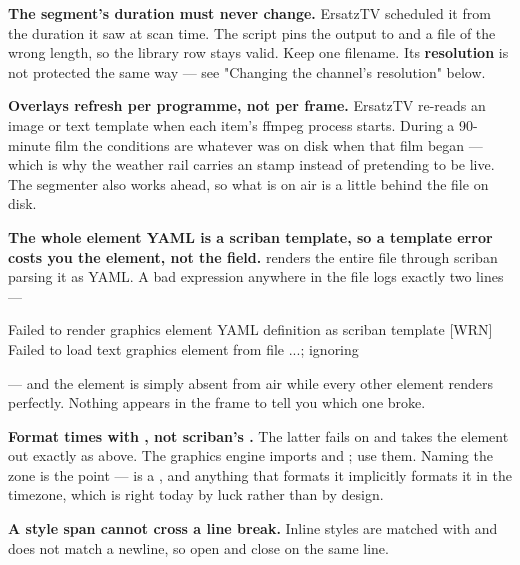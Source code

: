 \documentclass[fontpath=fonts/,logopath=logo/]{riposte-doc}
\begin{document}
\textbf{The segment's duration must never change.} ErsatzTV scheduled it from the duration it saw at scan time. The script pins the output to  and  a file of the wrong length, so the library row stays valid. Keep one filename. Its \textbf{resolution} is not protected the same way — see "Changing the channel's resolution" below.

\textbf{Overlays refresh per programme, not per frame.} ErsatzTV re-reads an image or text template when each item's ffmpeg process starts. During a 90-minute film the conditions are whatever was on disk when that film began — which is why the weather rail carries an  stamp instead of pretending to be live. The segmenter also works ahead, so what is on air is a little behind the file on disk.

\textbf{The whole element YAML is a scriban template, so a template error costs you the element, not the field.}  renders the entire file through scriban  parsing it as YAML. A bad expression anywhere in the file logs exactly two lines —

\ripcodeopen
{}
\begin{ripcodeblock}
[WRN] Failed to render graphics element YAML definition as scriban template
[WRN] Failed to load text graphics element from file ...; ignoring
\end{ripcodeblock}
\ripcodesizereset\ripcodeclose

— and the element is simply absent from air while every other element renders perfectly. Nothing appears in the frame to tell you which one broke.

\textbf{Format times with , not scriban's .} The latter fails on  and takes the element out exactly as above. The graphics engine imports  and ; use them. Naming the zone is the point —  is a , and anything that formats it implicitly formats it in the  timezone, which is right today by luck rather than by design.

\textbf{A style span cannot cross a line break.} Inline styles are matched with  and  does not match a newline, so open and close  on the same line.
\end{document}
